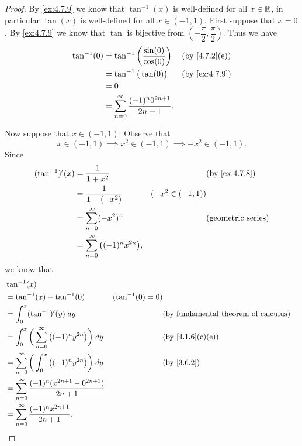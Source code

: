 \begin{proof}
  By \cref{ex:4.7.9} we know that \(\tan^{-1}(x)\) is well-defined for all \(x \in \mathbb{R}\), in particular \(\tan(x)\) is well-defined for all \(x \in (-1, 1)\).
  First suppose that \(x = 0\).
  By \cref{ex:4.7.9} we know that \(\tan\) is bijective from \((-\dfrac{\pi}{2}, \dfrac{\pi}{2})\).
  Thus we have
  \begin{align*}
    \tan^{-1}(0) & = \tan^{-1}\bigg(\dfrac{\sin(0)}{\cos(0)}\bigg)          &  & \text{(by \cref{4.7.2}(e))} \\
                 & = \tan^{-1}\big(\tan(0)\big)                             &  & \by{ex:4.7.9}               \\
                 & = 0                                                                                       \\
                 & = \sum_{n = 0}^\infty \dfrac{(-1)^n 0^{2n + 1}}{2n + 1}.
  \end{align*}

  Now suppose that \(x \in (-1, 1)\).
  Observe that
  \[
    x \in (-1, 1) \implies x^2 \in (-1, 1) \implies -x^2 \in (-1, 1).
  \]
  Since
  \begin{align*}
    (\tan^{-1})'(x) & = \dfrac{1}{1 + x^2}                           &                    & \by{ex:4.7.8}             \\
                    & = \dfrac{1}{1 - (-x^2)}                        & (-x^2 \in (-1, 1))                             \\
                    & = \sum_{n = 0}^\infty (-x^2)^n                 &                    & \text{(geometric series)} \\
                    & = \sum_{n = 0}^\infty \big((-1)^n x^{2n}\big),
  \end{align*}
  we know that
  \begin{align*}
     & \tan^{-1}(x)                                                                                                                                  \\
     & = \tan^{-1}(x) - \tan^{-1}(0)                                              & (\tan^{-1}(0) = 0)                                               \\
     & = \int_0^x (\tan^{-1})'(y) \; dy                                           &                    & \text{(by fundamental theorem of calculus)} \\
     & = \int_{0}^x \bigg(\sum_{n = 0}^\infty \big((-1)^n y^{2n}\big)\bigg) \; dy &                    & \text{(by \cref{4.1.6}(c)(e))}              \\
     & = \sum_{n = 0}^\infty \bigg(\int_{0}^x \big((-1)^n y^{2n}\big)\bigg) \; dy &                    & \by{3.6.2}                                  \\
     & = \sum_{n = 0}^\infty \dfrac{(-1)^n (x^{2n + 1} - 0^{2n + 1})}{2n + 1}                                                                        \\
     & = \sum_{n = 0}^\infty \dfrac{(-1)^n x^{2n + 1}}{2n + 1}.
  \end{align*}


\end{proof}
